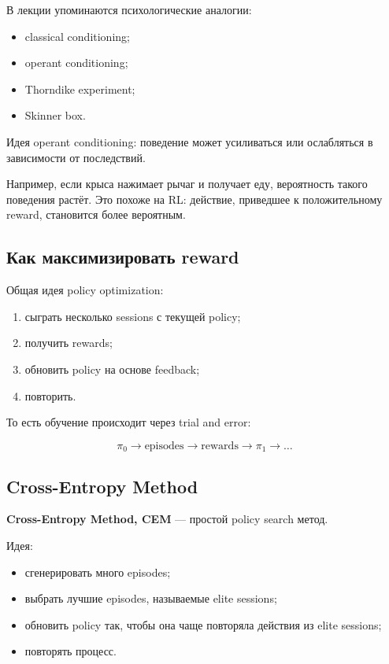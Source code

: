 \documentclass[a4paper,12pt]{article}
\begin{document}
В лекции упоминаются психологические аналогии:

\begin{itemize}
    \item classical conditioning;
    \item operant conditioning;
    \item Thorndike experiment;
    \item Skinner box.
\end{itemize}

Идея operant conditioning: поведение может усиливаться или ослабляться в зависимости от последствий.

Например, если крыса нажимает рычаг и получает еду, вероятность такого поведения растёт. Это похоже на RL: действие, приведшее к положительному reward, становится более вероятным.

\subsection{Как максимизировать reward}

Общая идея policy optimization:

\begin{enumerate}
    \item сыграть несколько sessions с текущей policy;
    \item получить rewards;
    \item обновить policy на основе feedback;
    \item повторить.
\end{enumerate}

То есть обучение происходит через trial and error:

\[
\pi_0
\rightarrow
\text{episodes}
\rightarrow
\text{rewards}
\rightarrow
\pi_1
\rightarrow
\dots
\]

\subsection{Cross-Entropy Method}

\textbf{Cross-Entropy Method, CEM} --- простой policy search метод.

Идея:

\begin{itemize}
    \item сгенерировать много episodes;
    \item выбрать лучшие episodes, называемые elite sessions;
    \item обновить policy так, чтобы она чаще повторяла действия из elite sessions;
    \item повторять процесс.
\end{itemize}
\end{document}
